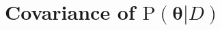 \documentclass[12pt]{article}
\begin{document}
%
%
%
%
%
%
%



\section{Covariance of $\text{P}(\bm{\theta}|D)$} \label{app:cov_theta_D}
\end{document}
